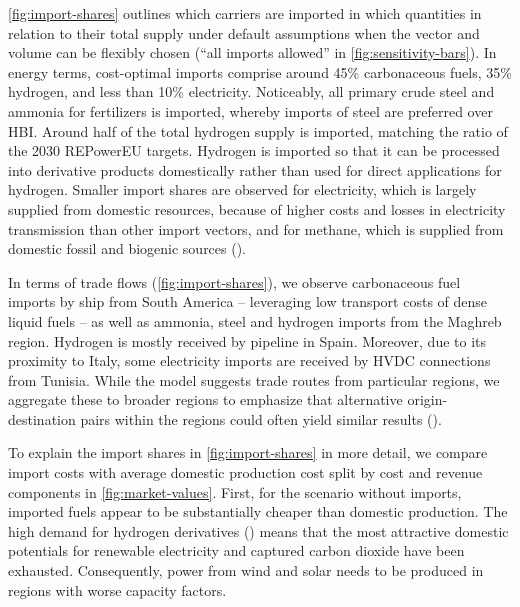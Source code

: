 
\cref{fig:import-shares} outlines which carriers are imported in which
quantities in relation to their total supply under default assumptions when the
vector and volume can be flexibly chosen (``all imports allowed'' in
\cref{fig:sensitivity-bars}). In energy terms, cost-optimal imports comprise
around 45\% carbonaceous fuels, 35\% hydrogen, and less than 10\% electricity.
Noticeably, all primary crude steel and ammonia for fertilizers is imported,
whereby imports of steel are preferred over HBI. Around half of the total
hydrogen supply is imported, matching the ratio of the 2030 REPowerEU
targets.\cite{europeancommissionRepowerEUPlan} Hydrogen is imported so that it
can be processed into derivative products domestically rather than used for
direct applications for hydrogen. Smaller import shares are observed for
electricity, which is largely supplied from domestic resources, because of
higher costs and losses in electricity transmission than other import vectors,
and for methane, which is supplied from domestic fossil and biogenic sources
().


In terms of trade flows (\cref{fig:import-shares}), we observe carbonaceous fuel
imports by ship from South America -- leveraging low transport costs of dense
liquid fuels -- as well as ammonia, steel and hydrogen imports from the Maghreb
region. Hydrogen is mostly received by pipeline in Spain. Moreover, due to its
proximity to Italy, some electricity imports are received by HVDC connections
from Tunisia. While the model suggests trade routes from particular regions, we
aggregate these to broader regions to emphasize that alternative
origin-destination pairs within the regions could often yield similar results
().


To explain the import shares in \cref{fig:import-shares} in more detail, we
compare import costs with average domestic production cost split by cost and
revenue components in \cref{fig:market-values}. First, for the scenario without
imports, imported fuels appear to be substantially cheaper than domestic
production. The high demand for hydrogen derivatives ()
means that the most attractive domestic potentials for renewable electricity and
captured carbon dioxide have been exhausted. Consequently, power from wind and
solar needs to be produced in regions with worse capacity factors.

